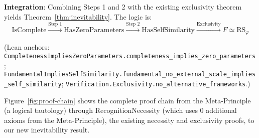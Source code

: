 \documentclass[12pt]{article}
\theoremstyle{remark}
\begin{document}
\textbf{Integration}: Combining Steps 1 and 2 with the existing exclusivity theorem yields Theorem~\ref{thm:inevitability}. The logic is:
\[
\mathrm{IsComplete} \xrightarrow{\text{Step 1}} \mathrm{HasZeroParameters} \xrightarrow{\text{Step 2}} \mathrm{HasSelfSimilarity} \xrightarrow{\text{Exclusivity}} F \simeq \mathrm{RS}_\varphi
\]

\noindent (Lean anchors: \texttt{CompletenessImpliesZeroParameters.completeness\_implies\_zero\_parameters}; \texttt{FundamentalImpliesSelfSimilarity.fundamental\_no\_external\_scale\_implies\_self\_similarity}; \texttt{Verification.Exclusivity.no\_alternative\_frameworks}.)

Figure~\ref{fig:proof-chain} shows the complete proof chain from the Meta-Principle (a logical tautology) through RecognitionNecessity (which uses 0 additional axioms from the Meta-Principle), the existing necessity and exclusivity proofs, to our new inevitability result.
\end{document}
